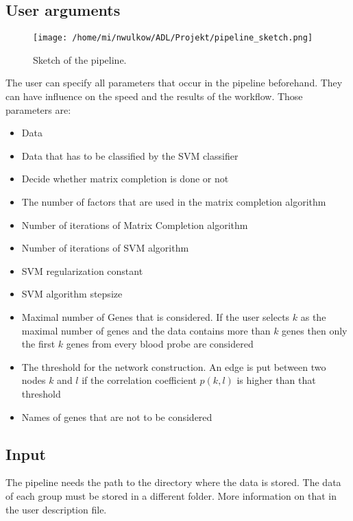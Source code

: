 \documentclass{bioinfo}
\begin{document}
 

\subsection{User arguments}
\begin{figure}[!ht]
\centering
\texttt{[image: /home/mi/nwulkow/ADL/Projekt/pipeline\_sketch.png]}
\caption{Sketch of the pipeline.}
\label{data_readin_geneslist}
\end{figure}

    The user can specify all parameters that occur in the pipeline beforehand. They can have influence on the speed and the results of the workflow. Those parameters are:
\begin{itemize}
\item Data
\item Data that has to be classified by the SVM classifier
\item Decide whether matrix completion is done or not
\item The number of factors that are used in the matrix completion algorithm
\item Number of iterations of Matrix Completion algorithm
\item Number of iterations of SVM algorithm
\item SVM regularization constant
\item SVM algorithm stepsize
\item Maximal number of Genes that is considered. If the user selects $k$ as the maximal number of genes and the data contains more than $k$ genes then only the first $k$ genes from every blood probe are considered
\item The threshold for the network construction. An edge is put between two nodes $k$ and $l$ if the correlation coefficient $p(k,l)$ is higher than that threshold
\item Names of genes that are not to be considered
\end{itemize}

\subsection{Input}
The pipeline needs the path to the directory where the data is stored. The data of each group must be stored in a different folder. More information on that in the user description file.
\end{document}
